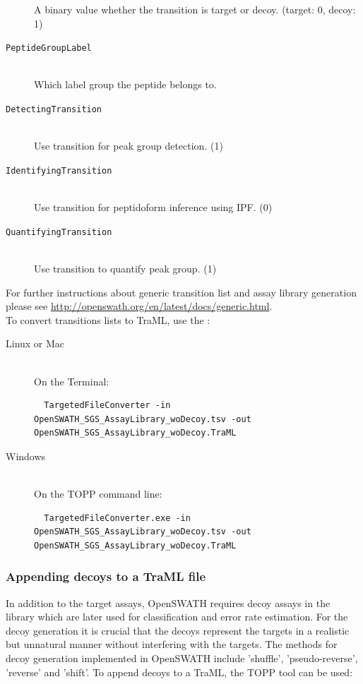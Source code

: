 \begin{description}
  A binary value whether the transition is target or decoy. (target: 0, decoy: 1)
  \item[\texttt{PeptideGroupLabel}] \hfill \\
  Which label group the peptide belongs to. \\
  \item[\texttt{DetectingTransition}] \hfill \\
  Use transition for peak group detection. (1)\\
  \item[\texttt{IdentifyingTransition}] \hfill \\
  Use transition for peptidoform inference using IPF. (0)\\
  \item[\texttt{QuantifyingTransition}] \hfill \\
  Use transition to quantify peak group. (1)\\
\end{description}

\noindent For further instructions about generic transition list and assay library generation please see \url{http://openswath.org/en/latest/docs/generic.html}. \\

\noindent To convert transitions lists to TraML, use the : \\

\begin{description}
  \item[Linux or Mac] \hfill \\
    On the Terminal:
    \begin{lstlisting}
  TargetedFileConverter -in OpenSWATH_SGS_AssayLibrary_woDecoy.tsv -out OpenSWATH_SGS_AssayLibrary_woDecoy.TraML
  \end{lstlisting}
  \item[Windows] \hfill \\
    On the TOPP command line:
    \begin{lstlisting}
  TargetedFileConverter.exe -in OpenSWATH_SGS_AssayLibrary_woDecoy.tsv -out OpenSWATH_SGS_AssayLibrary_woDecoy.TraML
  \end{lstlisting}
\end{description}

\subsubsection{Appending decoys to a TraML file}
In addition to the target assays, OpenSWATH requires decoy assays in the library which are later used for classification and error rate estimation. For the decoy generation it is crucial that the decoys represent the targets in a realistic but unnatural manner without interfering with the targets. The methods for decoy generation implemented in OpenSWATH include 'shuffle', 'pseudo-reverse', 'reverse' and 'shift'. To append decoys to a TraML, the TOPP tool  can be used:

